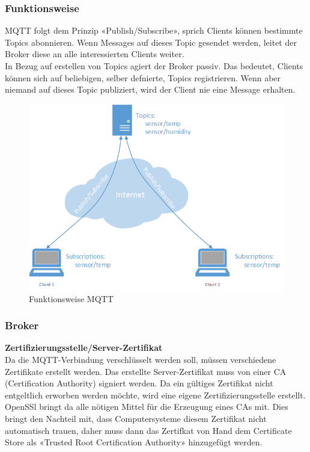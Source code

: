 \subsubsection{Funktionsweise}
MQTT folgt dem Prinzip «Publish/Subscribe», sprich Clients können bestimmte Topics abonnieren. Wenn Messages auf dieses Topic gesendet werden, leitet der Broker diese an alle interessierten Clients weiter. \\
In Bezug auf erstellen von Topics agiert der Broker passiv. Das bedeutet, Clients können sich auf beliebigen, selber defnierte, Topics registrieren. Wenn aber niemand auf dieses Topic publiziert, wird der Client nie eine Message erhalten.

\begin{figure}[h!]
	\centering
		\includegraphics[scale=0.6]{report/img/mqttFunktionsweise}
	\caption{Funktionsweise MQTT}
	\label{fig:deploymentAzure}
\end{figure}

\subsubsection{Broker}

\textbf{Zertifizierungsstelle/Server-Zertifikat} \\
Da die MQTT-Verbindung verschlüsselt werden soll, müssen verschiedene Zertifikate erstellt werden. Das erstellte Server-Zertifikat muss von einer CA (Certification Authority) signiert werden. Da ein gültiges Zertifikat nicht entgeltlich erworben werden möchte, wird eine eigene Zertifizierungsstelle erstellt. OpenSSl bringt da alle nötigen Mittel für die Erzeugung eines CAs mit. Dies bringt den Nachteil mit, dass Computersysteme diesem Zertifikat nicht automatisch trauen, daher muss dann das Zertifkat von Hand dem Certificate Store als «Trusted Root Certification Authority» hinzugefügt werden. \\

